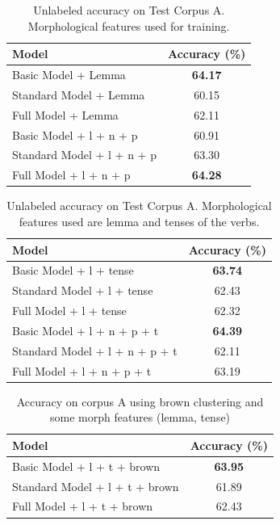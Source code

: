 \documentclass[11pt,letterpaper]{article}
\begin{document}
\begin{table}
\begin{center}
  \begin{tabular}{ l || c }
  \hline
  Model & Accuracy (\%)\\
  \hline
  Basic Model + Lemma& \textbf{64.17} \\
  Standard Model + Lemma& 60.15 \\
  Full Model + Lemma& 62.11 \\
  \hline
  Basic Model + l + n + p& 60.91\\
  Standard Model + l + n + p& 63.30 \\
  Full Model + l + n + p& \textbf{64.28} \\
  \hline
   \end{tabular}
\end{center}
\caption{Unlabeled accuracy on Test Corpus A. Morphological features used for training.}
\label{Third}
\end{table}

\begin{table}
\begin{center}
  \begin{tabular}{ l || c }
  \hline
  Model & Accuracy (\%)\\
  \hline
  Basic Model + l + tense& \textbf{63.74} \\
  Standard Model + l + tense& 62.43\\
  Full Model + l + tense & 62.32 \\
  \hline
  Basic Model + l + n + p + t & \textbf{64.39}\\
  Standard Model + l + n + p + t & 62.11\\
  Full Model + l + n + p + t & 63.19\\
  \hline
   \end{tabular}
\end{center}
\caption{Unlabeled accuracy on Test Corpus A. Morphological features used are lemma and tenses of the verbs.}
\label{Third_with_tense}
\end{table}

\begin{table}
\begin{center}
  \begin{tabular}{ l || c }
  \hline
  Model & Accuracy (\%)\\
  \hline
  Basic Model + l + t + brown& \textbf{63.95} \\
  Standard Model + l + t + brown& 61.89\\
  Full Model + l + t + brown & 62.43 \\
  \hline
\end{tabular}
\end{center}
\caption{Accuracy on corpus A using brown clustering and some morph features (lemma, tense)}
\label{Unsupervised}
\end{table}
\end{document}
